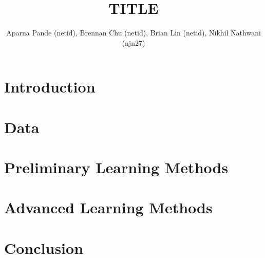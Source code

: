 \documentclass[a4paper,11pt]{article}
\author{Aparna Pande (netid), Brennan Chu (netid), Brian Lin (netid), Nikhil Nathwani (njn27)}
\title{TITLE}
\begin{document}
       \maketitle

\section{Introduction}


\section{Data}



\section{Preliminary Learning Methods}





\section{Advanced Learning Methods}



\section{Conclusion}

\end{document}
